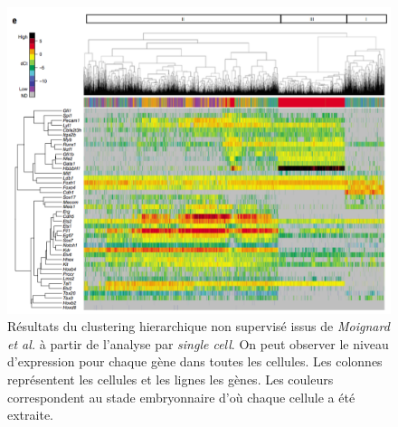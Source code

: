 \documentclass[fleqn,11pt]{SelfArx} %
\begin{document}
\begin{figure}[ht]
\centering
\includegraphics[width=\linewidth]{images/article2}
\caption{Résultats du clustering hierarchique non supervisé issus de \textit{Moignard et al.} à partir de l'analyse par \textit{single cell}. On peut observer le niveau d'expression pour chaque gène dans toutes les cellules. Les colonnes représentent les cellules et les lignes les gènes. Les couleurs correspondent au stade embryonnaire d'où chaque cellule a été extraite.}
\label{fig:article2}
\end{figure}


\end{document}
